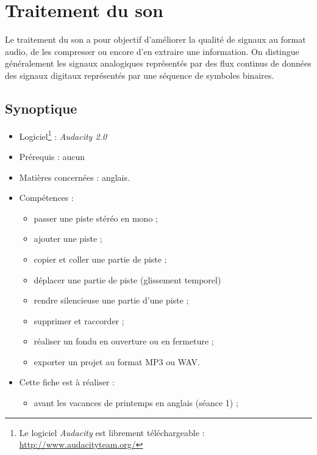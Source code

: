 \chapter{Traitement du son}  

Le traitement du son a pour objectif d'améliorer la qualité de signaux au format audio, de les compresser ou encore d'en extraire une information. On distingue généralement les signaux analogiques représentés par des flux continus de données des signaux digitaux représentés par une séquence de symboles binaires.

\section*{Synoptique}

{\footnotesize
\begin{itemize}
\item Logiciel\footnote{Le logiciel \emph{Audacity} est librement téléchargeable : \url{http://www.audacityteam.org/}} : \emph{Audacity 2.0} 
\item Prérequis : aucun
\item Matières concernées : anglais.
\item Compétences : 
        \begin{itemize}
        \item passer une piste stéréo en mono ;
        \item ajouter une piste ;
        \item copier et coller une partie de piste ;
        \item déplacer une partie de piste (glissement temporel)
        \item rendre silencieuse une partie d'une piste ;
        \item supprimer et raccorder ;
        \item réaliser un fondu en ouverture ou en fermeture ;
        \item exporter un projet au format MP3 ou WAV.
        \end{itemize}
\item Cette fiche est à réaliser :
        \begin{itemize}
        \item avant les vacances de printemps en anglais (séance 1) ;
        \end{itemize}
\end{itemize}
}%

